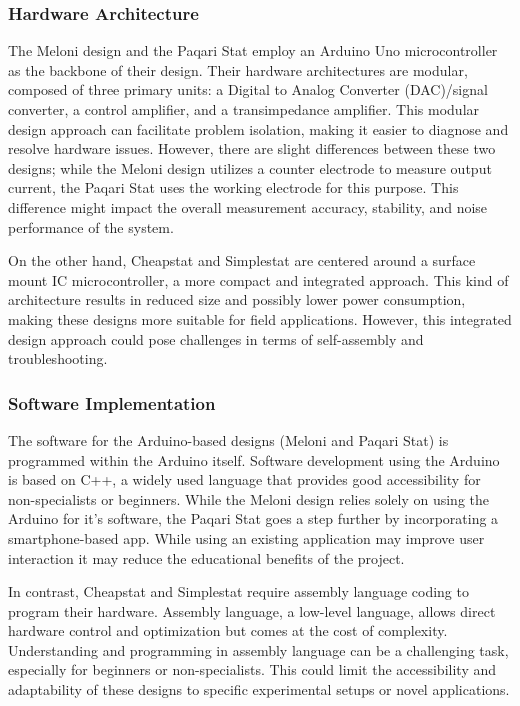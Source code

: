\documentclass{article}
\begin{document}
\subsubsection*{Hardware Architecture}
The Meloni design and the Paqari Stat employ an Arduino Uno microcontroller as the backbone of their design. Their hardware architectures are modular, composed of three primary units: a Digital to Analog Converter (DAC)/signal converter, a control amplifier, and a transimpedance amplifier. This modular design approach can facilitate problem isolation, making it easier to diagnose and resolve hardware issues. However, there are slight differences between these two designs; while the Meloni design utilizes a counter electrode to measure output current, the Paqari Stat uses the working electrode for this purpose. This difference might impact the overall measurement accuracy, stability, and noise performance of the system. 

On the other hand, Cheapstat and Simplestat are centered around a surface mount IC microcontroller, a more compact and integrated approach. This kind of architecture results in reduced size and possibly lower power consumption, making these designs more suitable for field applications. However, this integrated design approach could pose challenges in terms of self-assembly and troubleshooting.

\subsubsection*{Software Implementation}
The software for the Arduino-based designs (Meloni and Paqari Stat) is programmed within the Arduino itself. Software development using the Arduino is based on C++, a widely used language that provides good accessibility for non-specialists or beginners. While the Meloni design relies solely on using the Arduino for it's software, the Paqari Stat goes a step further by incorporating a smartphone-based app. While using an existing application may improve user interaction it may reduce the educational benefits of the project.

In contrast, Cheapstat and Simplestat require assembly language coding to program their hardware. Assembly language, a low-level language, allows direct hardware control and optimization but comes at the cost of complexity. Understanding and programming in assembly language can be a challenging task, especially for beginners or non-specialists. This could limit the accessibility and adaptability of these designs to specific experimental setups or novel applications.
\end{document}
